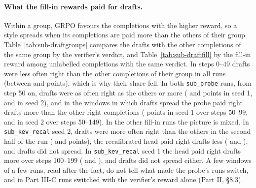 \paragraph{What the fill-in rewards paid for drafts.} Within a group, GRPO favours the completions with the higher
reward, so a style spreads when its completions are paid more than the others of their group. Table~\ref{tab:sub-draftgroups}
compares the drafts with the other completions of the same group by the verifier's verdict, and Table~\ref{tab:sub-draftfill}
by the fill-in reward among unlabelled completions with the same verdict. In steps 0--49 drafts were less often right
than the other completions of their group in all  runs (between  and
 points), which is why their share fell. In both \texttt{sub\_probe} runs, from step 50 on, drafts
were as often right as the others or more ( and  points in
seed 1,  and  in seed 2), and in the windows in which
drafts spread the probe paid right drafts more than the other right completions (
points in seed 1 over steps 50--99,  and  in seed 2
over steps 50--149). In the other fill-in runs the picture is mixed. In \texttt{sub\_kev\_recal} seed 2, drafts were
more often right than the others in the second half of the run ( and
 points), the recalibrated head paid right drafts less (
and ), and drafts did not spread. In \texttt{sub\_kev\_recal} seed 1 the head paid right
drafts more over steps 100--199 ( and ), and drafts
did not spread either. A few windows of a few runs, read after the fact, do not tell what made the probe's runs switch,
and in Part III-C runs switched with the verifier's reward alone (Part II, \S8.3).

\begin{table}[t]
\centering\small

\caption{Training completions that open with an informal draft, per 50-step window: their share, and $\Delta$ right,
the mean over the groups that hold both kinds of the share of drafts the verifier accepts minus that of the other
completions of the group, in percentage points.}
\label{tab:sub-draftgroups}
\end{table}

